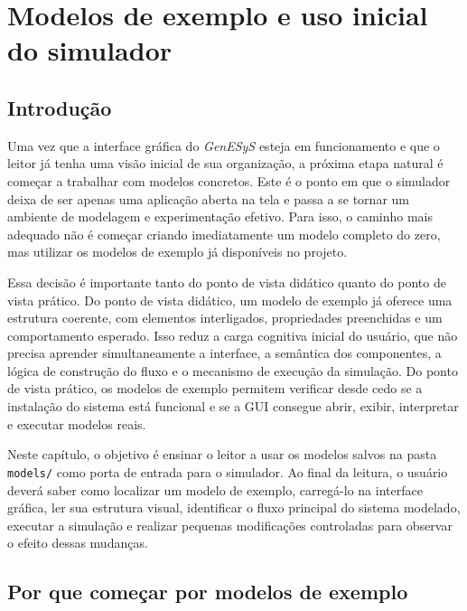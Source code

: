 \chapter{Modelos de exemplo e uso inicial do simulador}
\label{chap:modelos_de_exemplo_e_uso_inicial}

\section{Introdução}
\label{sec:cap4_introducao}

Uma vez que a interface gráfica do \textit{GenESyS} esteja em funcionamento e que o leitor já tenha uma visão inicial de sua organização, a próxima etapa natural é começar a trabalhar com modelos concretos. Este é o ponto em que o simulador deixa de ser apenas uma aplicação aberta na tela e passa a se tornar um ambiente de modelagem e experimentação efetivo. Para isso, o caminho mais adequado não é começar criando imediatamente um modelo completo do zero, mas utilizar os modelos de exemplo já disponíveis no projeto.

Essa decisão é importante tanto do ponto de vista didático quanto do ponto de vista prático. Do ponto de vista didático, um modelo de exemplo já oferece uma estrutura coerente, com elementos interligados, propriedades preenchidas e um comportamento esperado. Isso reduz a carga cognitiva inicial do usuário, que não precisa aprender simultaneamente a interface, a semântica dos componentes, a lógica de construção do fluxo e o mecanismo de execução da simulação. Do ponto de vista prático, os modelos de exemplo permitem verificar desde cedo se a instalação do sistema está funcional e se a GUI consegue abrir, exibir, interpretar e executar modelos reais.

Neste capítulo, o objetivo é ensinar o leitor a usar os modelos salvos na pasta \texttt{models/} como porta de entrada para o simulador. Ao final da leitura, o usuário deverá saber como localizar um modelo de exemplo, carregá-lo na interface gráfica, ler sua estrutura visual, identificar o fluxo principal do sistema modelado, executar a simulação e realizar pequenas modificações controladas para observar o efeito dessas mudanças.

\section{Por que começar por modelos de exemplo}
\label{sec:cap4_por_que_comecar_por_modelos_exemplo}


